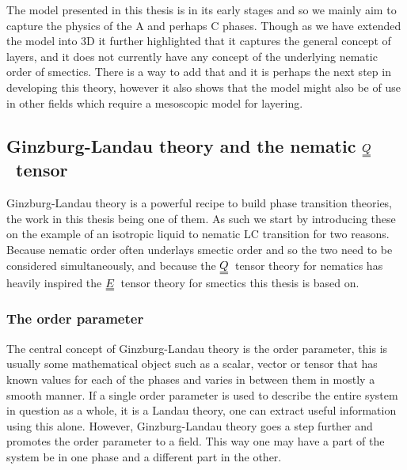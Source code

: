 \documentclass[12pt]{article}
\newcommand{\duf}[2]{\stackunder[0.5pt]{\stackunder[0.8pt]{\stackunder[1pt]{\ensuremath{#1}}{\rule{\widthof{\ensuremath{#2}}*\real{0.9}}{.1ex}}}{\rule{\widthof{\ensuremath{#2}}*\real{0.9}}{.1ex}}}{}}
\newcommand{\du}[1]{\duf{#1}{#1}}
\newcommand{\QQ}{\ensuremath{\du{Q}}}
\newcommand{\EE}{\ensuremath{\du{E}}}
\begin{document}

    The model presented in this thesis is in its early stages and so we mainly aim to capture the physics of the A and perhaps C phases.
    Though as we have extended the model into 3D it further highlighted that it captures the general concept of layers, and it does not currently have any concept of the underlying nematic order of smectics.
    There is a way to add that and it is perhaps the next step in developing this theory, however it also shows that the model might also be of use in other fields which require a mesoscopic model for layering.

    \subsection{Ginzburg-Landau theory and the nematic \QQ\ tensor}\label{sec:intro_GL_nem}
        Ginzburg-Landau theory is a powerful recipe to build phase transition theories, the work in this thesis being one of them.
        As such we start by introducing these on the example of an isotropic liquid to nematic LC transition for two reasons.
        Because nematic order often underlays smectic order and so the two need to be considered simultaneously, and because the \QQ\ tensor theory for nematics has heavily inspired the \EE\ tensor theory for smectics this thesis is based on.

        \subsubsection{The order parameter}\label{sec:intro_Q}
        The central concept of Ginzburg-Landau theory is the order parameter, this is usually some mathematical object such as a scalar, vector or tensor that has known values for each of the phases and varies in between them in mostly a smooth manner.
        If a single order parameter is used to describe the entire system in question as a whole, it is a Landau theory, one can extract useful information using this alone.
        However, Ginzburg-Landau theory goes a step further and promotes the order parameter to a field.
        This way one may have a part of the system be in one phase and a different part in the other.
\end{document}
